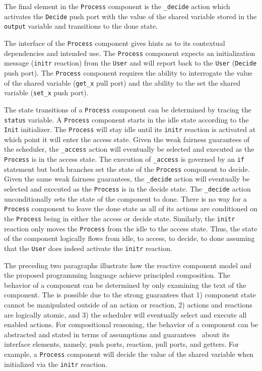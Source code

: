 The final element in the \verb+Process+ component is the \verb+_decide+ action which activates the \verb+Decide+ push port with the value of the shared variable stored in the \verb+output+ variable and transitions to the done state.

The interface of the \verb+Process+ component gives hints as to its contextual dependencies and intended use.
The \verb+Process+ component expects an initialization message (\verb+initr+ reaction) from the \verb+User+ and will report back to the \verb+User+ (\verb+Decide+ push port).
The \verb+Process+ component requires the ability to interrogate the value of the shared variable (\verb+get_x+ pull port) and the ability to the set the shared variable (\verb+set_x+ push port).

The state transitions of a \verb+Process+ component can be determined by tracing the \verb+status+ variable.
A \verb+Process+ component starts in the idle state according to the \verb+Init+ initializer.
The \verb+Process+ will stay idle until its \verb+initr+ reaction is activated at which point it will enter the access state.
Given the weak fairness guarantees of the scheduler, the \verb+_access+ action will eventually be selected and executed as the \verb+Process+ is in the access state.
The execution of \verb+_access+ is governed by an \verb+if+ statement but both branches set the state of the \verb+Process+ component to decide.
Given the same weak fairness guarantees, the \verb+_decide+ action will eventually be selected and executed as the \verb+Process+ is in the decide state.
The \verb+_decide+ action unconditionally sets the state of the component to done.
There is no way for a \verb+Process+ component to leave the done state as all of its actions are conditioned on the \verb+Process+ being in either the access or decide state.
Similarly, the \verb+initr+ reaction only moves the \verb+Process+ from the idle to the access state.
Thus, the state of the component logically flows from idle, to access, to decide, to done assuming that the \verb+User+ does indeed activate the \verb+initr+ reaction.

The preceding two paragraphs illustrate how the reactive component model and the proposed programming language achieve principled composition.
The behavior of a component can be determined by only examining the text of the component.
The is possible due to the strong guarantees that 1) component state cannot be manipulated outside of an action or reaction, 2) actions and reactions are logically atomic, and 3) the scheduler will eventually select and execute all enabled actions.
For compositional reasoning, the behavior of a component can be abstracted and stated in terms of assumptions and guarantees~\cite{Jones:1983:TST:69575.69577} about its interface elements, namely, push ports, reaction, pull ports, and getters.
For example, a \verb+Process+ component will decide the value of the shared variable when initialized via the \verb+initr+ reaction.

